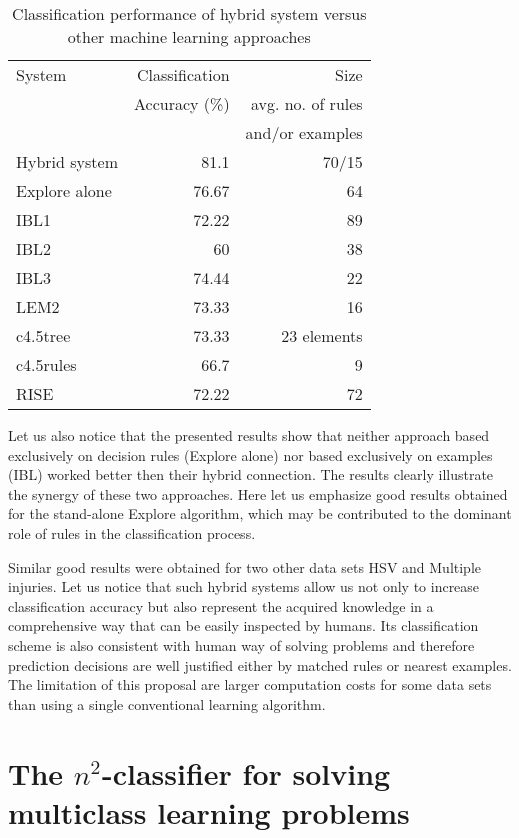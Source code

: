 \documentclass{article}
\begin{document}
\begin{table}
\caption{Classification performance of hybrid system versus other machine
learning approaches}\vspace{2pt}
\begin{center}
\begin{tabular}{lrr}
\hline System & \quad Classification & Size \\ & Accuracy (\%) &
avg. no. of rules \\ &  & and/or examples \\ \hline
Hybrid system &
81.1 & 70/15 \\ Explore alone & 76.67 & 64 \\ IBL1 & 72.22 & 89 \\
IBL2 & 60 & 38 \\ IBL3 & 74.44 & 22 \\ LEM2 & 73.33 & 16
\\ c4.5tree & 73.33 & 23 elements \\ c4.5rules & 66.7 & 9 \\ RISE
& 72.22 & 72 \\ \hline
\end{tabular}
\end{center}
\end{table}

Let us also notice that the presented results show that neither
approach based exclusively on decision rules (Explore alone) nor
based exclusively on examples (IBL) worked better then their
hybrid connection. The results clearly illustrate the synergy of
these two approaches. Here let us emphasize good results obtained
for the stand-alone Explore algorithm, which may be contributed to
the dominant role of rules in the classification process.

Similar good results were obtained for two other data sets HSV and
Multiple injuries.  Let us notice that such hybrid systems allow
us not only to increase classification accuracy but also represent
the acquired knowledge in a comprehensive way that can be easily
inspected by humans. Its classification scheme is also consistent
with human way of solving problems and therefore prediction
decisions are well justified either by matched rules or nearest
examples. The limitation of this proposal are larger computation
costs for some data sets than using a single conventional learning
algorithm.

\section{The $n^2$-classifier for solving multiclass learning problems}
\end{document}
